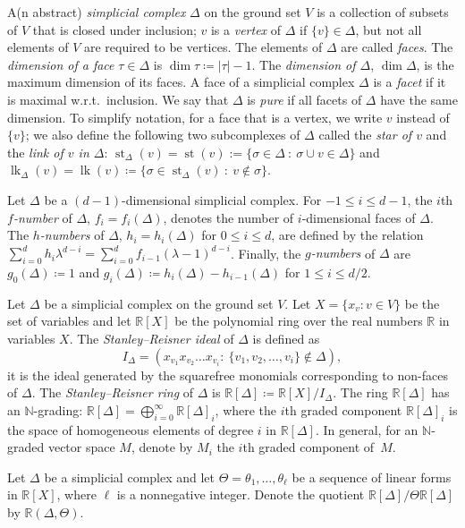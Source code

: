 \documentclass[ALCO,ThmDefs,Unicode,epreuves]{cedram}
\DeclareMathOperator{\lk}{lk}
\DeclareMathOperator{\st}{st}
\newcommand{\N}{\mathbb{N}}
\newcommand{\R}{\mathbb{R}{}}
\begin{document}
A(n abstract) \emph{simplicial complex} $\Delta$ on the ground set $V$ is a collection of subsets of $V$ that is closed under inclusion; $v$ is a \emph{vertex} of $\Delta$ if $\{v\}\in \Delta$, but not all elements of $V$ are required to be vertices. The elements of $\Delta$ are called \emph{faces}. The \emph{dimension of a face} $\tau\in\Delta$ is $\dim\tau\coloneqq |\tau|-1$. The \emph{dimension of $\Delta$}, $\dim\Delta$, is the maximum dimension of its faces. A face of a simplicial complex $\Delta$ is a \emph{facet} if it is maximal w.r.t.~inclusion. We say that $\Delta$ is \emph{pure} if all facets of $\Delta$ have the same dimension. To simplify notation, for a face that is a vertex, we write $v$ instead of $\{v\}$; we also define the following two subcomplexes of $\Delta$ called the \emph{star of $v$} and the \emph{link of $v$ in $\Delta$}:
$\st_\Delta(v)=\st(v):=\{\sigma\in\Delta \ : \ \sigma\cup v\in\Delta\}$ and $\lk_\Delta(v)=\lk(v)\coloneqq  \{\sigma\in \st_\Delta(v) \ : \ v\notin\sigma\}$.


Let $\Delta$ be a $(d-1)$-dimensional simplicial complex. For $-1 \leq i \leq d-1$, the $i$th \emph{$f$-number} of $\Delta$, $f_i = f_i(\Delta)$, denotes the number of $i$-dimensional faces of $\Delta$. The \emph{$h$-numbers} of $\Delta$, $h_i=h_i(\Delta)$ for $0 \leq i \leq d$, are defined by the relation $\sum_{i=0}^{d}h_i\lambda^{d-i}=\sum_{i=0}^{d}f_{i-1}(\lambda-1)^{d-i}$. Finally, the \emph{$g$-numbers} of $\Delta$ are $g_0(\Delta)\coloneqq 1$ and $g_i(\Delta)\coloneqq h_i(\Delta)-h_{i-1}(\Delta)$ for $1 \leq i \leq d/2$.



Let $\Delta$ be a simplicial complex on the ground set $V$. Let $X = \{x_v : v \in V\}$ be the set of variables and let $\R[X]$ be the polynomial ring over the real numbers $\R$ in variables $X$. The \emph{Stanley--Reisner ideal} of $\Delta$ is defined as 
\[
I_\Delta=\left(x_{v_1}x_{v_2}\dots x_{v_i}: \ \{v_1, v_2, \dots, v_i\}\notin \Delta\right),
\] 
\ie
it is the ideal generated by the squarefree monomials corresponding to non-faces of $\Delta$. The \emph{Stanley--Reisner ring} of $\Delta$ is $\R[\Delta] \coloneqq  \R[X]/I_\Delta$. The ring $\R[\Delta]$ has an $\N$-grading: $\R[\Delta]= \bigoplus_{i=0}^{\infty} \R[\Delta]_i$, where the $i$th graded component $\R[\Delta]_i$ is the space of homogeneous elements of degree $i$ in $\R[\Delta]$. In general, for an $\N$-graded vector space $M$, denote by $M_i$ the $i$th graded component of~$M$.

Let $\Delta$ be a simplicial complex and let $\Theta=\theta_1,\ldots,\theta_\ell$ be a sequence of linear forms in $\R[X]$, where $\ell$ is a nonnegative integer. Denote the quotient $\R[\Delta]/\Theta\R[\Delta]$ by $\R(\Delta,\Theta)$. 
\end{document}
